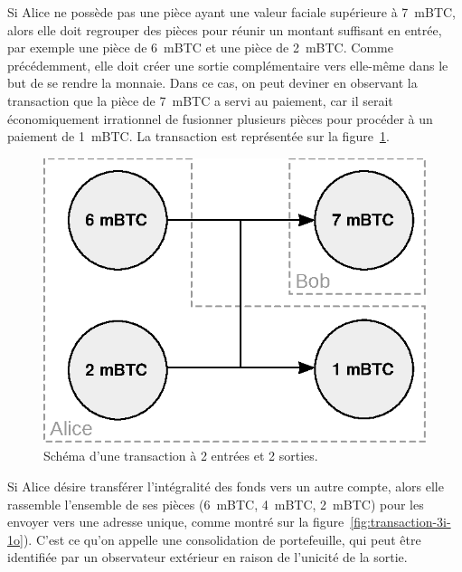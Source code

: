 Si Alice ne possède pas une pièce ayant une valeur faciale supérieure à 7~mBTC, alors elle doit regrouper des pièces pour réunir un montant suffisant en entrée, par exemple une pièce de 6~mBTC et une pièce de 2~mBTC. Comme précédemment, elle doit créer une sortie complémentaire vers elle-même dans le but de se rendre la monnaie. Dans ce cas, on peut deviner en observant la transaction que la pièce de 7~mBTC a servi au paiement, car il serait économiquement irrationnel de fusionner plusieurs pièces pour procéder à un paiement de 1~mBTC. La transaction est représentée sur la figure~\ref{fig:transaction-2i-2o}.

\begin{figure}[ht]
  \centering
  \includegraphics[scale=0.75]{img/transaction-2i-2o.eps}
  \caption{Schéma d'une transaction à 2 entrées et 2 sorties.}
  \label{fig:transaction-2i-2o}
\end{figure}

Si Alice désire transférer l'intégralité des fonds vers un autre compte, alors elle rassemble l'ensemble de ses pièces (6~mBTC, 4~mBTC, 2~mBTC) pour les envoyer vers une adresse unique, comme montré sur la figure~\ref{fig:transaction-3i-1o}). C'est ce qu'on appelle une consolidation de portefeuille, qui peut être identifiée par un observateur extérieur en raison de l'unicité de la sortie.


